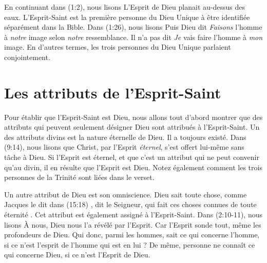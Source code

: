En continuant dans (1:2), nous lisons\frcolon{}
 \Og L'Esprit de Dieu planait au-dessus des eaux. \Fg{}
 L'Esprit-Saint est la première personne du Dieu Unique à être identifiée
 séparément dans la Bible.
 Dans (1:26), nous lisons\frcolon{}
 \Og Puis Dieu dit\frcolon{} \emph{Faisons} l'homme à \emph{notre} image
 selon \emph{notre} ressemblance. \Fg{}
 Il n'a pas dit\frcolon{} \Og \emph{Je} vais faire l'homme à \emph{mon} image. \Fg{}
 En d'autres termes, les trois personnes du Dieu Unique parlaient conjointement.

\section{Les attributs de l'Esprit-Saint}

Pour établir que l'Esprit-Saint est Dieu, nous allons tout d'abord montrer
 que des attributs qui peuvent seulement désigner Dieu sont attribués à
 l'Esprit-Saint.
 Un des attributs divins est la nature éternelle de Dieu.
 Il a toujours existé. Dans (9:14), nous lisons que Christ,
 par l'Esprit \emph{éternel}, s'est offert lui-même sans tâche à Dieu.
 Si l'Esprit est éternel, et que c'est un attribut qui ne peut convenir
 qu'au divin, il en résulte que l'Esprit est Dieu.
 Notez également comment les trois personnes de la Trinité sont liées
 dans le verset.

Un autre attribut de Dieu est son omniscience. Dieu sait toute chose, comme
 Jacques le dit dans (15:18)\frcolon{}
 \Og [\dots{}], dit le Seigneur, qui fait ces choses connues de toute éternité
 . \Fg{}
 Cet attribut est également assigné à
 l'Esprit-Saint. Dans (2:10-11), nous lisons\frcolon{} \Og À nous, Dieu
 nous l'a révélé par l'Esprit. Car l'Esprit sonde tout, même les profondeurs de
 Dieu. Qui donc, parmi les hommes, sait ce qui concerne l'homme, si ce n'est
 l'esprit de l'homme qui est en lui ? De même, personne ne connaît ce qui
 concerne Dieu, si ce n'est l'Esprit de Dieu. \Fg{}

